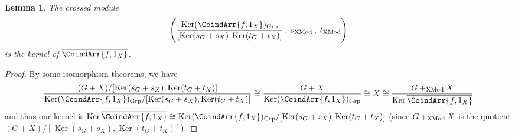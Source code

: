 \documentclass[a4paper, british, reqno]{amsart}
\newcommand*{\iso}{\cong}
\DeclareMathOperator{\Ker}{Ker} %
\renewcommand*{\and}{,}
\renewcommand*{\and}{,}
\newcommand*{\CatName}[1]{\textnormal{#1}}
\newcommand*{\Grp}{\CatName{Grp}}
\newcommand*{\XMod}{\CatName{XMod}}
\newtheorem{lemma}[theorem]{Lemma}
\theoremstyle{definition}
\theoremstyle{remark}
\begin{document}
\begin{lemma}
	\label{lem:kernel XMod}
	The crossed module
	\[
		\Biggl(\frac{\Ker(\CoindArr{f\and 1_X})_\Grp}{[\Ker(s_G+ s_X) , \Ker(t_G+ t_X)]} \:,\: s_\XMod \:,\: t_\XMod\Biggr)
	\]
	is the kernel of \(\overline{\CoindArr{f\and 1_X}}\).
\end{lemma}
\begin{proof}
	By some isomorphism theorems, we have
	\[
		\frac{(G+X)/[\Ker(s_G+s_X) , \Ker(t_G+t_X)]}{\Ker(\CoindArr{f\and 1_X})_{\Grp}/[\Ker(s_G+s_X) , \Ker(t_G+t_X)]} \iso \frac{G+X}{\Ker(\CoindArr{f\and 1_X})_{\Grp}} \iso X \iso \frac{G+_{\XMod}X}{\Ker\overline{\CoindArr{f \and 1_X}}}
	\]
	and thus our kernel is \(\Ker\overline{\CoindArr{f \and 1_X}} \iso \Ker(\CoindArr{f\and 1_X})_{\Grp}/[\Ker(s_G+s_X) , \Ker(t_G+t_X)]\) (since \(G+_{\XMod}X\) is the quotient \((G+X)/[\Ker(s_G+s_X) , \Ker(t_G+t_X)]\)).
\end{proof}
\end{document}
